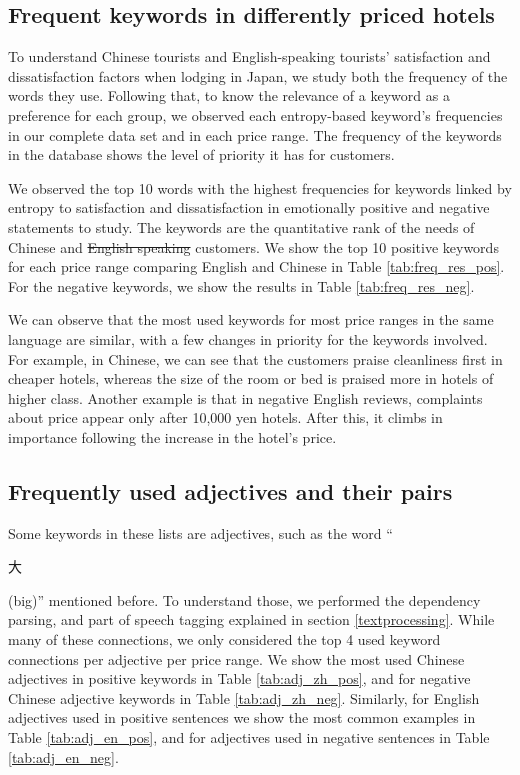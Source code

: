 \documentclass[smallextended,natbib]{svjour3}       %
\providecommand{\DIFadd}[1]{{\protect\color{blue}\uwave{#1}}} %
\providecommand{\DIFdel}[1]{{\protect\color{red}\sout{#1}}}                      %
\providecommand{\DIFaddbegin}{} %
\providecommand{\DIFaddend}{} %
\providecommand{\DIFdelbegin}{} %
\providecommand{\DIFdelend}{} %
\newcommand{\DIFscaledelfig}{0.5}
\newlength{\DIFdelgraphicswidth} %
\newlength{\DIFdelgraphicsheight} %
\newcommand{\DIFaddincludegraphics}[2][]{{\color{blue}\fbox{\DIFOincludegraphics[#1]{#2}}}} %
\newcommand{\DIFdelincludegraphics}[2][]{%
\sbox{\DIFdelgraphicsbox}{\DIFOincludegraphics[#1]{#2}}%
\settoboxwidth{\DIFdelgraphicswidth}{\DIFdelgraphicsbox} %
\settoboxtotalheight{\DIFdelgraphicsheight}{\DIFdelgraphicsbox} %
\scalebox{\DIFscaledelfig}{%
\parbox[b]{\DIFdelgraphicswidth}{\usebox{\DIFdelgraphicsbox}\\[-\baselineskip] \rule{\DIFdelgraphicswidth}{0em}}\llap{\resizebox{\DIFdelgraphicswidth}{\DIFdelgraphicsheight}{%
\setlength{\unitlength}{\DIFdelgraphicswidth}%
\begin{picture}(1,1)%
\thicklines\linethickness{2pt} %
{\color[rgb]{1,0,0}\put(0,0){\framebox(1,1){}}}%
{\color[rgb]{1,0,0}\put(0,0){\line( 1,1){1}}}%
{\color[rgb]{1,0,0}\put(0,1){\line(1,-1){1}}}%
\end{picture}%
}\hspace*{3pt}}} %
} %
\DeclareRobustCommand{\DIFaddbegin}{\DIFOaddbegin \let\includegraphics\DIFaddincludegraphics} %
\DeclareRobustCommand{\DIFaddend}{\DIFOaddend \let\includegraphics\DIFOincludegraphics} %
\DeclareRobustCommand{\DIFdelbegin}{\DIFOdelbegin \let\includegraphics\DIFdelincludegraphics} %
\DeclareRobustCommand{\DIFdelend}{\DIFOaddend \let\includegraphics\DIFOincludegraphics} %
\begin{document}
  \subsection{Frequent keywords in differently priced hotels}\label{svmresults}

    To understand Chinese tourists and English-speaking tourists' satisfaction and dissatisfaction factors when lodging in Japan, we study both the frequency of the words they use. Following that, to know the relevance of a keyword as a preference for each group, we observed each entropy-based keyword's frequencies in our complete data set and in each price range. The frequency of the keywords in the database shows the level of priority it has for customers.

    We observed the top 10 words with the highest frequencies for keywords linked by entropy to satisfaction and dissatisfaction in emotionally positive and negative statements to study. The keywords are the quantitative rank of the needs of Chinese and \DIFdelbegin \DIFdel{English speaking }\DIFdelend \DIFaddbegin \DIFadd{English-speaking }\DIFaddend customers. We show the top 10 positive keywords for each price range comparing English and Chinese in Table \ref{tab:freq_res_pos}. For the negative keywords, we show the results in Table \ref{tab:freq_res_neg}.

    We can observe that the most used keywords for most price ranges in the same language are similar, with a few changes in priority for the keywords involved. For example, in Chinese, we can see that the customers praise cleanliness first in cheaper hotels, whereas the size of the room or bed is praised more in hotels of higher class. Another example is that in negative English reviews, complaints about price appear only after 10,000 yen hotels. After this, it climbs in importance following the increase in the hotel's price.

  \subsection{Frequently used adjectives and their pairs}\label{adjresults}

    Some keywords in these lists are adjectives, such as the word ``\begin{CJK}{UTF8}{gbsn}大\end{CJK} (big)'' mentioned before. To understand those, we performed the dependency parsing, and part of speech tagging explained in section \ref{textprocessing}. While many of these connections, we only considered the top 4 used keyword connections per adjective per price range. We show the most used Chinese adjectives in positive keywords in Table \ref{tab:adj_zh_pos}, and for negative Chinese adjective keywords in Table \ref{tab:adj_zh_neg}. Similarly, for English adjectives used in positive sentences we show the most common examples in Table \ref{tab:adj_en_pos}, and for adjectives used in negative sentences in Table \ref{tab:adj_en_neg}.
\end{document}
